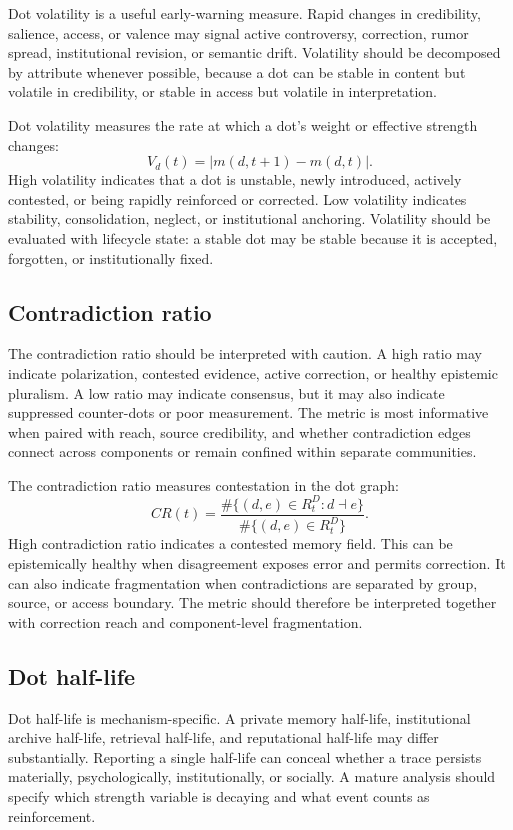 \documentclass[11pt]{article}
\theoremstyle{remark}
\begin{document}
Dot volatility is a useful early-warning measure. Rapid changes in credibility, salience, access, or valence may signal active controversy, correction, rumor spread, institutional revision, or semantic drift. Volatility should be decomposed by attribute whenever possible, because a dot can be stable in content but volatile in credibility, or stable in access but volatile in interpretation.


Dot volatility measures the rate at which a dot's weight or effective strength changes:
\[
V_d(t)=|m(d,t+1)-m(d,t)|.
\]
High volatility indicates that a dot is unstable, newly introduced, actively contested, or being rapidly reinforced or corrected. Low volatility indicates stability, consolidation, neglect, or institutional anchoring. Volatility should be evaluated with lifecycle state: a stable dot may be stable because it is accepted, forgotten, or institutionally fixed.

\subsection{Contradiction ratio}\label{contradiction-ratio}

The contradiction ratio should be interpreted with caution. A high ratio may indicate polarization, contested evidence, active correction, or healthy epistemic pluralism. A low ratio may indicate consensus, but it may also indicate suppressed counter-dots or poor measurement. The metric is most informative when paired with reach, source credibility, and whether contradiction edges connect across components or remain confined within separate communities.


The contradiction ratio measures contestation in the dot graph:
\[
CR(t)=\frac{\#\{(d,e)\in R_t^D: d\dashv e\}}{\#\{(d,e)\in R_t^D\}}.
\]
High contradiction ratio indicates a contested memory field. This can be epistemically healthy when disagreement exposes error and permits correction. It can also indicate fragmentation when contradictions are separated by group, source, or access boundary. The metric should therefore be interpreted together with correction reach and component-level fragmentation.

\subsection{Dot half-life}\label{dot-half-life}

Dot half-life is mechanism-specific. A private memory half-life, institutional archive half-life, retrieval half-life, and reputational half-life may differ substantially. Reporting a single half-life can conceal whether a trace persists materially, psychologically, institutionally, or socially. A mature analysis should specify which strength variable is decaying and what event counts as reinforcement.
\end{document}
